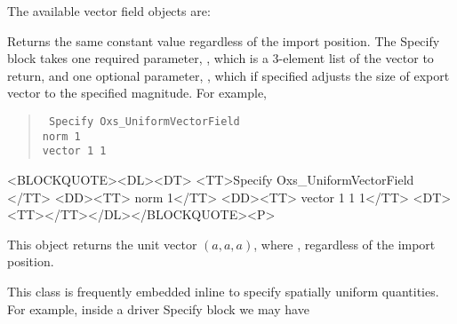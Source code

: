 \noindent
The available vector field objects are:
\begin{description}
%
\item[Oxs\_UniformVectorField:\label{item:UniformVectorField}]
   Returns the same constant value regardless of the import position.
   The Specify block takes one required parameter, ,
   which is a 3-element list of the vector to return, and one optional
   parameter, , which if specified adjusts the size of
   export vector to the specified magnitude.  For example,
   \begin{latexonly}
   \begin{quote}\tt
      Specify Oxs\_UniformVectorField \ocb\\
      \bi norm 1\\
      \bi vector  1 1\ccb\\
      \ccb
   \end{quote}
   \end{latexonly}
   \begin{rawhtml}
   <BLOCKQUOTE><DL><DT>
      <TT>Specify Oxs_UniformVectorField {</TT>
      <DD><TT> norm 1</TT>
      <DD><TT> vector {1 1 1}</TT>
   <DT><TT>}</TT></DL></BLOCKQUOTE><P>
   \end{rawhtml}
   This object returns the unit vector $(a,a,a)$, where
   , regardless of the import
   position.

   This class is frequently embedded inline to specify spatially uniform
   quantities.  For example, inside a driver Specify block we may have


\end{description}
